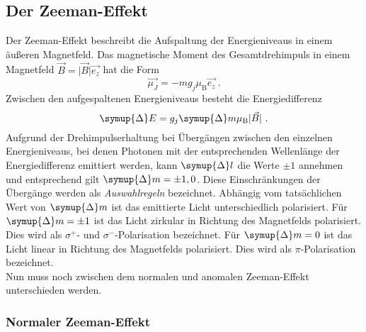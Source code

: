 \subsection{Der Zeeman-Effekt}

    Der Zeeman-Effekt beschreibt die Aufspaltung der Energieniveaus in einem äußeren Magnetfeld.
    Das magnetische Moment des Gesamtdrehimpuls in einem Magnetfeld $\vec{B} = \lvert \vec{B} \rvert \vec{e_z}$ hat die Form
    \begin{equation}
        \vec{\mu_J} = - m g_j \mu_\text{B} \vec{e_z} \ .
    \end{equation}
    Zwischen den aufgespaltenen Energieniveaus besteht die Energiedifferenz
    \begin{equation}
        \symup{\Delta} E = g_j \symup{\Delta} m \mu_\text{B} \lvert \vec{B} \rvert \ .
        \label{eqn:energiedifferenz}
    \end{equation}
    Aufgrund der Drehimpulserhaltung bei Übergängen zwischen den einzelnen Energieniveaus,
    bei denen Photonen mit der entsprechenden Wellenlänge der Energiedifferenz emittiert werden,
    kann $\symup{\Delta} l$ die Werte $\pm 1$ annehmen und entsprechend gilt $\symup{\Delta} m = \pm 1, 0$.
    Diese Einschränkungen der Übergänge werden als \textit{Auswahlregeln} bezeichnet.
    Abhängig vom tatsächlichen Wert von $\symup{\Delta} m$ ist das emittierte Licht unterschiedlich polarisiert.
    Für $\symup{\Delta} m = \pm 1$ ist das Licht zirkular in Richtung des Magnetfelds polarisiert.
    Dies wird als $\sigma^+$- und $\sigma^-$-Polarisation bezeichnet.
    Für $\symup{\Delta} m = 0$ ist das Licht linear in Richtung des Magnetfelds polarisiert.
    Dies wird als $\pi$-Polarisation bezeichnet.\\
    Nun muss noch zwischen dem normalen und anomalen Zeeman-Effekt unterschieden werden.


\subsubsection{Normaler Zeeman-Effekt}
\label{sec:theorie:zeeman:normal}

